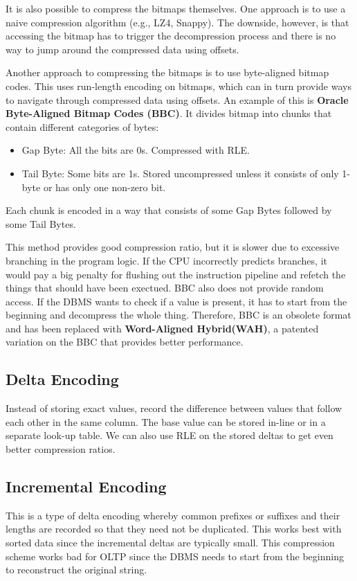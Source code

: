 \documentclass[11pt]{article}
\begin{document}
It is also possible to compress the bitmaps themselves. One approach is to use a naive
compression algorithm (e.g., LZ4, Snappy). The downside, however, is that accessing the bitmap has
to trigger the decompression process and there is no way to jump around the compressed data using
offsets.

Another approach to compressing the bitmaps is to use byte-aligned bitmap codes. This uses
run-length encoding on bitmaps, which can in turn provide ways to navigate through compressed data
using offsets. An example of this is \textbf{Oracle Byte-Aligned Bitmap Codes (BBC)}. It divides
bitmap into chunks that contain different categories of bytes:
\begin{itemize}
    \item Gap Byte: All the bits are 0s. Compressed with RLE.
    \item Tail Byte: Some bits are 1s. Stored uncompressed unless it consists of only 1-byte or has only one non-zero bit.
\end{itemize}
Each chunk is encoded in a way that consists of some Gap Bytes followed by some Tail Bytes. 

This method provides good compression ratio, but it is slower due to excessive branching in the
program logic. If the CPU incorrectly predicts branches, it would pay a big penalty for flushing out
the instruction pipeline and refetch the things that should have been exectued. BBC also does not
provide random access. If the DBMS wants to check if a value is present, it has to start from the
beginning and decompress the whole thing. Therefore, BBC is an obsolete format and has been replaced
with \textbf{Word-Aligned Hybrid(WAH)}, a patented variation on the BBC that provides better
performance.

\subsection*{Delta Encoding}
Instead of storing exact values, record the difference between values that follow each other in the same column. The base value can be stored in-line or in a separate look-up table. We can also use RLE on the stored deltas to get even better compression ratios.

\subsection*{Incremental Encoding}
This is a type of delta encoding whereby common prefixes or suffixes and their lengths are
recorded so that they need not be duplicated. This works best with sorted data since the incremental
deltas are typically small. This compression scheme works bad for OLTP since the DBMS needs to start
from the beginning to reconstruct the original string.
\end{document}
